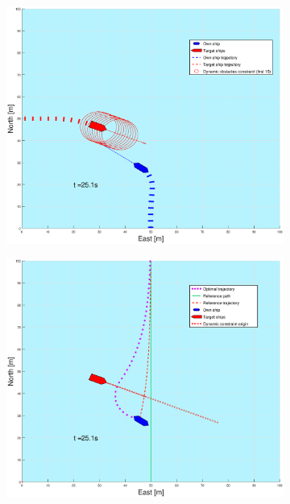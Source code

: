 \begin{figure}[!b]
\begin{subfigure}[b]{0.499\textwidth}
    \end{subfigure}
    \hfill
    \\
    \begin{subfigure}[b]{0.49\textwidth}
        \centering
        \includegraphics[width=\textwidth]{Images/Figures/enkel_SO/_Simple_1fig1_time=25}
    \end{subfigure}
    \hfill
    \begin{subfigure}[b]{0.499\textwidth}
        \centering
        \includegraphics[width=\textwidth]{Images/Figures/enkel_SO/_Simple_1fig999_time=25}
    \end{subfigure}
    \hfill
\end{figure}%
